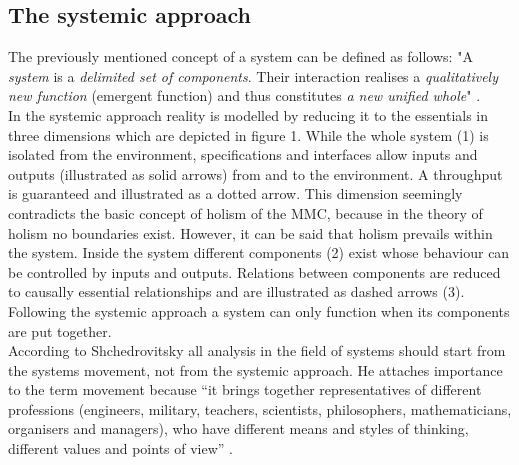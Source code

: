 \documentclass[11pt,a4paper]{article}
\begin{document}
\subsection{The systemic approach}
The previously mentioned concept of a system can be defined as follows: "A \emph{system} is a \emph{delimited set of components}. Their interaction realises a \emph{qualitatively new function} (emergent function) and thus constitutes \emph{a new unified whole}" \cite[p. 2]{GraebeSystems}. \\
In the systemic approach reality is modelled by reducing it to the essentials in three dimensions which are depicted in figure 1. While the whole system (1) is isolated from the environment, specifications and interfaces allow inputs and outputs (illustrated as solid arrows) from and to the environment. A throughput is guaranteed and illustrated as a dotted arrow. This dimension seemingly contradicts the basic concept of holism of the MMC, because in the theory of holism no boundaries exist. However, it can be said that holism prevails within the system. Inside the system different components (2) exist whose behaviour can be controlled by inputs and outputs. Relations between components are reduced to causally essential relationships and are illustrated as dashed arrows (3). \\
Following the systemic approach a system can only function when its components are put together. \\
According to Shchedrovitsky all analysis in the field of systems should start from the systems movement, not from the systemic approach. He attaches importance to the term movement because “it brings together representatives of different professions (engineers, military, teachers, scientists, philosophers, mathematicians, organisers and managers), who have different means and styles of thinking, different values and points of view” \cite[p. 3] {Principles}.
\end{document}
